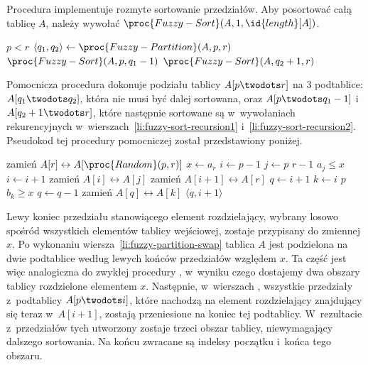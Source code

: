 Procedura  implementuje rozmyte sortowanie przedziałów. Aby posortować całą tablicę $A$, należy wywołać $\proc{Fuzzy-Sort}(A,1,\id{length}[A])$.
\begin{codebox}
\li	\If $p<r$
\li		\Then
			$\langle q_1,q_2\rangle\gets\proc{Fuzzy-Partition}(A,p,r)$
\li			$\proc{Fuzzy-Sort}(A,p,q_1-1)$ \label{li:fuzzy-sort-recursion1}
\li			$\proc{Fuzzy-Sort}(A,q_2+1,r)$ \label{li:fuzzy-sort-recursion2}
		\End
\end{codebox}

Pomocnicza procedura  dokonuje podziału tablicy $A[p\twodots r]$ na 3 podtablice: $A[q_1\twodots q_2]$, która nie musi być dalej sortowana, oraz $A[p\twodots q_1-1]$ i~$A[q_2+1\twodots r]$, które następnie sortowane są w~wywołaniach rekurencyjnych w~wierszach~\ref{li:fuzzy-sort-recursion1} i~\ref{li:fuzzy-sort-recursion2}. Pseudokod tej procedury pomocniczej został przedstawiony poniżej.
\begin{codebox}
\li	zamień $A[r]\leftrightarrow A[\proc{Random}(p,r)]$
\li	$x\gets a_r$
\li $i\gets p-1$
\li	\For $j\gets p$ \To $r-1$
\li		\Do
			\If $a_j\le x$
\li				\Then
					$i\gets i+1$
\li					zamień $A[i]\leftrightarrow A[j]$
				\End
		\End
\li	zamień $A[i+1]\leftrightarrow A[r]$ \label{li:fuzzy-partition-swap}
\li	$q\gets i+1$ \label{li:fuzzy-partition-q-init}
\li	\For $k\gets i$ \Downto $p$
\li		\Do
			\If $b_k\ge x$
\li				\Then
					$q\gets q-1$
\li					zamień $A[q]\leftrightarrow A[k]$
				\End
		\End \label{li:fuzzy-partition-for-end}
\li	\Return $\langle q,i+1\rangle$
\end{codebox}
Lewy koniec przedziału stanowiącego element rozdzielający, wybrany losowo spośród wszystkich elementów tablicy wejściowej, zostaje przypisany do zmiennej $x$. Po wykonaniu wiersza~\ref{li:fuzzy-partition-swap} tablica $A$ jest podzielona na dwie podtablice według lewych końców przedziałów względem $x$. Ta część jest więc analogiczna do zwykłej procedury , w~wyniku czego dostajemy dwa obszary tablicy rozdzielone elementem $x$. Następnie, w~wierszach \twodashes{\ref{li:fuzzy-partition-q-init}}{\ref{li:fuzzy-partition-for-end}}, wszystkie przedziały z~podtablicy $A[p\twodots i]$, które nachodzą na element rozdzielający znajdujący się teraz w~$A[i+1]$, zostają przeniesione na koniec tej podtablicy. W~rezultacie z~przedziałów tych utworzony zostaje trzeci obszar tablicy, niewymagający dalszego sortowania. Na końcu zwracane są indeksy początku i~końca tego obszaru.

